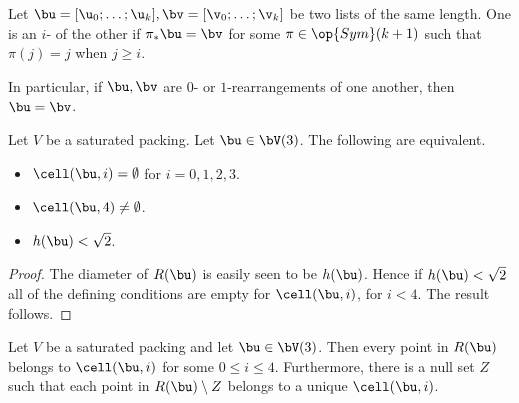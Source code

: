 \bigskip

\begin{definition}[$i$-rearrangement] 
Let $\bu=[\u_0;\ldots;\u_k],\bv=[\v_0;\ldots;\v_k]$ be two lists of the same length.  
One is an
 $i$- of the other if
$\pi_*\bu = \bv$ for some $\pi\in\op{Sym}(k+1)$ such
that 
$\pi(j) = j$  when $j \ge i$.
\end{definition}

In particular, if $\bu,\bv$ are $0$- or $1$-rearrangements of one another,
then $\bu = \bv$.


\begin{lemma}[]\label{lemma:M-complement4} 
Let $V$ be a saturated packing.  Let $\bu\in \bV(3)$.
The following are equivalent.
\begin{itemize} 
\item  $\cell(\bu,i)=\emptyset$ for $i=0,1,2,3$.
\item  $\cell(\bu,4)\ne\emptyset$.
\item  $h(\bu)<\sqrt2$.
\end{itemize}
\end{lemma}

\begin{proof} 
The diameter of $R(\bu)$ is easily seen to be $h(\bu)$.  Hence if $h(\bu)<\sqrt2$
all of the defining conditions are empty for $\cell(\bu,i)$, for $i<4$.  The result follows.
\end{proof}

\begin{lemma}[]\label{lemma:M-exhaust} 
Let $V$ be a saturated packing and let $\bu\in \bV(3)$. Then
every point in $R(\bu)$ 
belongs to $\cell(\bu,i)$  for some $0\le i\le 4$.  Furthermore, there is a null set  
$Z$ such that each point in $R(\bu)\setminus Z$ belongs to a unique
$\cell(\bu,i)$.
\end{lemma}

